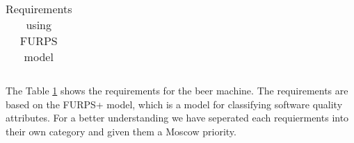 \begin{center}
\begin{longtable}{|p{1cm}|p{4cm}|p{8.5cm}|c|}
        \caption{Requirements using FURPS model}
        \label{tab:requirements}
    \end{longtable}
\end{center}

The Table \ref{tab:requirements} shows the requirements for the beer machine. The requirements are based on the FURPS+ model, which is a model for classifying software quality attributes. For a better understanding we have seperated each requierments into their own category and given them a Moscow priority.







